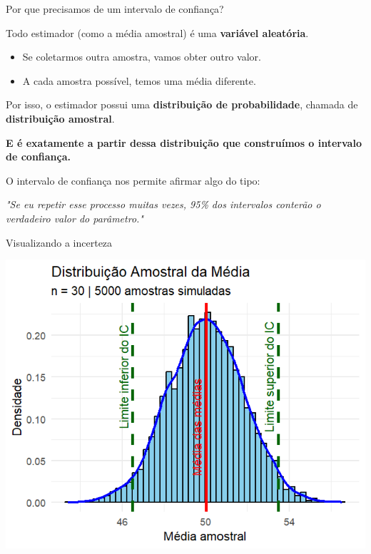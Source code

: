 \documentclass[14pt,aspectratio=1610]{beamer}
\begin{document}
	\begin{frame}{Por que precisamos de um intervalo de confiança?}
		\small
		\vspace{-0.3cm}
		\begin{block}{}
			\justifying
			
			Todo estimador (como a média amostral) é uma \textbf{variável aleatória}.
				\vspace{-0.3cm}
			\begin{itemize}
				\item Se coletarmos outra amostra, vamos obter outro valor.
				\item A cada amostra possível, temos uma média diferente.
			\end{itemize}
				\vspace{-0.3cm}
			Por isso, o estimador possui uma \textbf{distribuição de probabilidade}, chamada de \textbf{distribuição amostral}.
			
			\textbf{E é exatamente a partir dessa distribuição que construímos o intervalo de confiança.}

			
			O intervalo de confiança nos permite afirmar algo do tipo:
			
			\begin{center}
				\textit{"Se eu repetir esse processo muitas vezes, 95\% dos intervalos conterão o verdadeiro valor do parâmetro."}
			\end{center}
			
		\end{block}
		
	\end{frame}
	

\begin{frame}{Visualizando a incerteza}
	\vspace{-0.3cm}
	\begin{block}{}
		\centering
		\includegraphics[width=0.7\linewidth]{figs/Intervalo.png}
	\end{block}
	
\end{frame}
\end{document}
